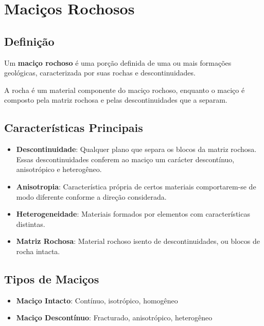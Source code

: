 \documentclass[12pt,a4paper,twoside]{book}
\begin{document}
\section{Maciços Rochosos}

\subsection{Definição}

Um \textbf{maciço rochoso} é uma porção definida de uma ou mais formações geológicas, caracterizada 
por suas rochas e descontinuidades.

A rocha é um material componente do maciço rochoso, enquanto o maciço é composto pela matriz rochosa 
e pelas descontinuidades que a separam.

\subsection{Características Principais}

\begin{itemize}
    \item \textbf{Descontinuidade}: Qualquer plano que separa os blocos da matriz rochosa. Essas 
    descontinuidades conferem ao maciço um carácter descontínuo, anisotrópico e heterogêneo.
    
    \item \textbf{Anisotropia}: Característica própria de certos materiais comportarem-se de modo 
    diferente conforme a direção considerada.
    
    \item \textbf{Heterogeneidade}: Materiais formados por elementos com características distintas.
    
    \item \textbf{Matriz Rochosa}: Material rochoso isento de descontinuidades, ou blocos de rocha intacta.
\end{itemize}

\subsection{Tipos de Maciços}

\begin{itemize}
    \item \textbf{Maciço Intacto}: Contínuo, isotrópico, homogêneo
    \item \textbf{Maciço Descontínuo}: Fracturado, anisotrópico, heterogêneo
\end{itemize}
\end{document}
